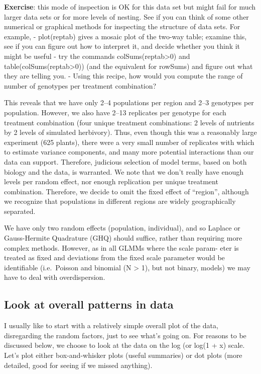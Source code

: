 \documentclass[
  12pt,
]{book}
\begin{document}
\textbf{Exercise}: this mode of inspection is OK for this data set but might fail for much larger data sets or for more levels of nesting. See if you can think of some other numerical or graphical methods for inspecting the structure of data sets. For example,
- plot(reptab) gives a mosaic plot of the two-way table; examine this, see if you can figure out how to interpret it, and decide whether you think it might be useful
- try the commands colSums(reptab\textgreater0) and table(colSums(reptab\textgreater0)) (and the equivalent for rowSums) and figure out what they are telling you.
- Using this recipe, how would you compute the range of number of genotypes per treatment combination?

This reveals that we have only 2--4 populations per region and 2--3 genotypes per population. However, we also have 2--13 replicates per genotype for each treatment combination (four unique treatment combinations: 2 levels of nutrients by 2 levels of simulated herbivory). Thus, even though this was a reasonably large experiment (625 plants), there were a very small number of replicates with which to estimate variance components, and many more potential interactions than our data can support. Therefore, judicious selection of model terms, based on both biology and the data, is warranted. We note that we don't really have enough levels per random effect, nor enough replication per unique treatment combination. Therefore, we decide to omit the fixed effect of ``region'', although we recognize that populations in different regions are widely geographically separated.

We have only two random effects (population, individual), and so Laplace or Gauss-Hermite Quadrature (GHQ) should suffice, rather than requiring more complex methods. However, as in all GLMMs where the scale param- eter is treated as fixed and deviations from the fixed scale parameter would be identifiable (i.e.~Poisson and binomial (N \textgreater{} 1), but not binary, models) we may have to deal with overdispersion.

\hypertarget{look-at-overall-patterns-in-data}{%
\subsection{Look at overall patterns in data}\label{look-at-overall-patterns-in-data}}

I usually like to start with a relatively simple overall plot of the data, disregarding the random factors, just to see what's going on. For reasons to be discussed below, we choose to look at the data on the log (or log(1 + x) scale. Let's plot either box-and-whisker plots (useful summaries) or dot plots (more detailed, good for seeing if we missed anything).
\end{document}
